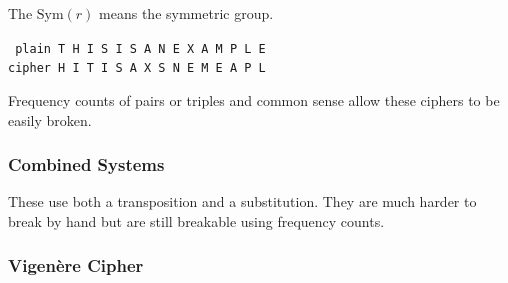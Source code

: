 \documentclass{article}
\begin{document}
The $\text{Sym}(r)$ means the symmetric group. \cite{wiki:sym}

\begin{center}
    \texttt{
         plain \quad T H I S I \; S A N E X \; A M P L E\\
        cipher \quad H I T I S \; A X S N E \;  M E A P L
    }
\end{center}

Frequency counts of pairs or triples and common sense allow these ciphers to be easily broken.

\subsubsection{Combined Systems}

These use both a transposition and a substitution. They are much harder to break by hand but are still breakable using frequency counts.

\subsubsection{Vigenère Cipher}

\newpage



\end{document}
